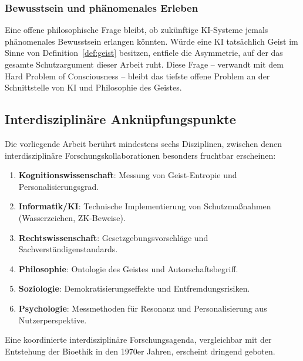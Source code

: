 ﻿\documentclass[a4paper,12pt]{article}
\theoremstyle{definition}
\begin{document}
\subsubsection{Bewusstsein und phänomenales Erleben}

Eine offene philosophische Frage bleibt, ob zukünftige KI-Systeme jemals phänomenales
Bewusstsein erlangen könnten. Würde eine KI tatsächlich Geist im Sinne von
Definition~\ref{def:geist} besitzen, entfiele die Asymmetrie, auf der das gesamte
Schutzargument dieser Arbeit ruht. Diese Frage -- verwandt mit dem Hard Problem of
Consciousness \cite{chalmers1996conscious} -- bleibt das tiefste offene Problem an
der Schnittstelle von KI und Philosophie des Geistes.

\subsection{Interdisziplinäre Anknüpfungspunkte}

Die vorliegende Arbeit berührt mindestens sechs Disziplinen, zwischen denen
interdisziplinäre Forschungskollaborationen besonders fruchtbar erscheinen:

\begin{enumerate}
    \item \textbf{Kognitionswissenschaft}: Messung von Geist-Entropie und
          Personalisierungsgrad.
    \item \textbf{Informatik/KI}: Technische Implementierung von Schutzmaßnahmen
          (Wasserzeichen, ZK-Beweise).
    \item \textbf{Rechtswissenschaft}: Gesetzgebungsvorschläge und
          Sachverständigenstandards.
    \item \textbf{Philosophie}: Ontologie des Geistes und Autorschaftsbegriff.
    \item \textbf{Soziologie}: Demokratisierungseffekte und Entfremdungsrisiken.
    \item \textbf{Psychologie}: Messmethoden für Resonanz und Personalisierung aus
          Nutzerperspektive.
\end{enumerate}

Eine koordinierte interdisziplinäre Forschungsagenda, vergleichbar mit der
Entstehung der Bioethik in den 1970er Jahren, erscheint dringend geboten.
\end{document}
